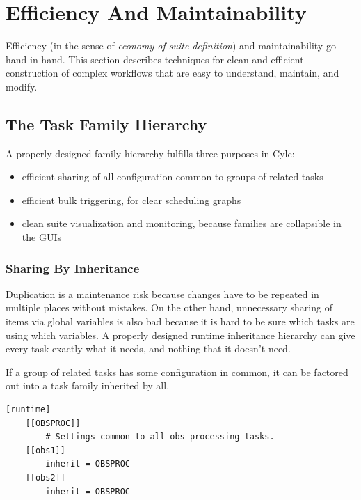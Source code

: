 \section{Efficiency And Maintainability}
\label{Efficiency And Maintainability}

Efficiency (in the sense of {\em economy of suite definition}) and
maintainability go hand in hand. This section describes techniques for clean
and efficient construction of complex workflows that are easy to understand,
maintain, and modify.

\subsection{The Task Family Hierarchy}
\label{The Task Family Hierarchy}

A properly designed family hierarchy fulfills three purposes in Cylc:

\begin{itemize}
  \item efficient sharing of all configuration common to groups of related
    tasks
  \item efficient bulk triggering, for clear scheduling graphs
  \item clean suite visualization and monitoring, because families are
    collapsible in the GUIs
\end{itemize}

\subsubsection{Sharing By Inheritance}
\label{Sharing By Inheritance}

Duplication is a maintenance risk because changes have to be repeated in
multiple places without mistakes. On the other hand, unnecessary sharing of
items via global variables is also bad because it is hard to be sure which
tasks are using which variables. A properly designed runtime inheritance
hierarchy can give every task exactly what it needs, and nothing that it
doesn't need.

If a group of related tasks has some configuration in common, it can be
factored out into a task family inherited by all.

\lstset{language=suiterc}
\begin{lstlisting}
[runtime]
    [[OBSPROC]]
        # Settings common to all obs processing tasks.
    [[obs1]]
        inherit = OBSPROC
    [[obs2]]
        inherit = OBSPROC
\end{lstlisting}

